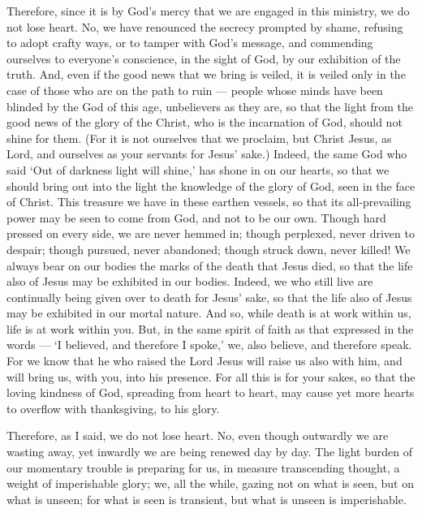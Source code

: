  Therefore, since it is by God's mercy that we are engaged
in this ministry, we do not lose heart.  No, we have
renounced the secrecy prompted by shame, refusing to adopt crafty ways,
or to tamper with God's message, and commending ourselves to everyone's
conscience, in the sight of God, by our exhibition of the truth.
 And, even if the good news that we bring is veiled, it is
veiled only in the case of those who are on the path to ruin ---
 people whose minds have been blinded by the God of this
age, unbelievers as they are, so that the light from the good news of
the glory of the Christ, who is the incarnation of God, should not shine
for them.  (For it is not ourselves that we proclaim, but
Christ Jesus, as Lord, and ourselves as your servants for Jesus' sake.)
 Indeed, the same God who said `Out of darkness light will
shine,' has shone in on our hearts, so that we should bring out into the
light the knowledge of the glory of God, seen in the face of Christ.
 This treasure we have in these earthen vessels, so that its
all-prevailing power may be seen to come from God, and not to be our
own.  Though hard pressed on every side, we are never hemmed
in; though perplexed, never driven to despair;  though
pursued, never abandoned; though struck down, never killed!
 We always bear on our bodies the marks of the death that
Jesus died, so that the life also of Jesus may be exhibited in our
bodies.  Indeed, we who still live are continually being
given over to death for Jesus' sake, so that the life also of Jesus may
be exhibited in our mortal nature.  And so, while death is
at work within us, life is at work within you.  But, in the
same spirit of faith as that expressed in the words --- `I believed, and
therefore I spoke,' we, also believe, and therefore speak. 
For we know that he who raised the Lord Jesus will raise us also with
him, and will bring us, with you, into his presence.  For
all this is for your sakes, so that the loving kindness of God,
spreading from heart to heart, may cause yet more hearts to overflow
with thanksgiving, to his glory.

 Therefore, as I said, we do not lose heart. No, even
though outwardly we are wasting away, yet inwardly we are being renewed
day by day.  The light burden of our momentary trouble is
preparing for us, in measure transcending thought, a weight of
imperishable glory;  we, all the while, gazing not on what
is seen, but on what is unseen; for what is seen is transient, but what
is unseen is imperishable.

